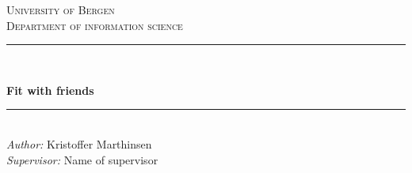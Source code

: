 \begin{titlepage}

\newcommand{\HRule}{\rule{\linewidth}{0.5mm}} %

\center %
 

\textsc{\LARGE University of Bergen \\ Department of information science}\\[1.5cm] %


\HRule \\[0.5cm]
\begin{Huge}
	\bfseries{Fit with friends}\\[0.7cm] %
\end{Huge}
\HRule \\[0.5cm]


\large \emph{Author:} Kristoffer Marthinsen\\
\large \emph{Supervisor:} Name of supervisor\\[2cm]




\end{titlepage}
